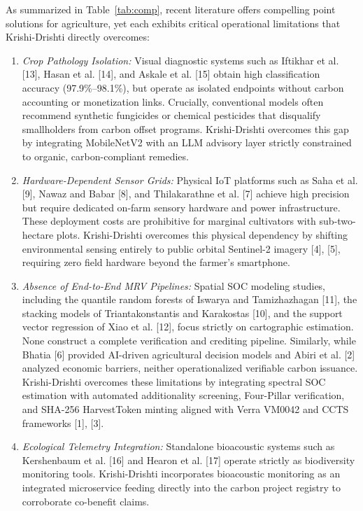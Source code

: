\documentclass[10pt,a4paper,twocolumn]{IEEEtran}
\begin{document}
As summarized in Table~\ref{tab:comp}, recent literature offers compelling point solutions for agriculture, yet each exhibits critical operational limitations that Krishi-Drishti directly overcomes:
\begin{enumerate}
  \item \emph{Crop Pathology Isolation:} Visual diagnostic systems such as Iftikhar et al. [13], Hasan et al. [14], and Askale et al. [15] obtain high classification accuracy (97.9\%--98.1\%), but operate as isolated endpoints without carbon accounting or monetization links. Crucially, conventional models often recommend synthetic fungicides or chemical pesticides that disqualify smallholders from carbon offset programs. Krishi-Drishti overcomes this gap by integrating MobileNetV2 with an LLM advisory layer strictly constrained to organic, carbon-compliant remedies.
  \item \emph{Hardware-Dependent Sensor Grids:} Physical IoT platforms such as Saha et al. [9], Nawaz and Babar [8], and Thilakarathne et al. [7] achieve high precision but require dedicated on-farm sensory hardware and power infrastructure. These deployment costs are prohibitive for marginal cultivators with sub-two-hectare plots. Krishi-Drishti overcomes this physical dependency by shifting environmental sensing entirely to public orbital Sentinel-2 imagery [4], [5], requiring zero field hardware beyond the farmer's smartphone.
  \item \emph{Absence of End-to-End MRV Pipelines:} Spatial SOC modeling studies, including the quantile random forests of Iswarya and Tamizhazhagan [11], the stacking models of Triantakonstantis and Karakostas [10], and the support vector regression of Xiao et al. [12], focus strictly on cartographic estimation. None construct a complete verification and crediting pipeline. Similarly, while Bhatia [6] provided AI-driven agricultural decision models and Abiri et al. [2] analyzed economic barriers, neither operationalized verifiable carbon issuance. Krishi-Drishti overcomes these limitations by integrating spectral SOC estimation with automated additionality screening, Four-Pillar verification, and SHA-256 HarvestToken minting aligned with Verra VM0042 and CCTS frameworks [1], [3].
  \item \emph{Ecological Telemetry Integration:} Standalone bioacoustic systems such as Kershenbaum et al. [16] and Hearon et al. [17] operate strictly as biodiversity monitoring tools. Krishi-Drishti incorporates bioacoustic monitoring as an integrated microservice feeding directly into the carbon project registry to corroborate co-benefit claims.
\end{enumerate}
\end{document}
